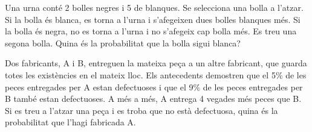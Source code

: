 \begin{probres}
{Una urna cont\'e 2 bolles negres i 5 de blanques. Se selecciona
una bolla a l'atzar. Si la bolla \'es blanca, es torna a l'urna i s'afegeixen
dues bolles blanques m\'es. Si la bolla \'es negra, no es torna a
l'urna i no s'afegeix cap bolla m\'es. Es treu una segona bolla. Quina \'es
la probabilitat que la bolla sigui blanca?}
\end{probres}


\begin{probres}
{Dos fabricants, A i B, entreguen la mateixa pe\c{c}a a un
altre fabricant, que guarda totes les exist\`encies en el mateix lloc. Els
antecedents demostren que el 5\% de les peces entregades per A estan
defectuoses i que el 9\% de les peces entregades per B tamb\'e estan
defectuoses. A m\'es a m\'es, A entrega 4 vegades m\'es peces que B. Si es treu a
l'atzar una pe\c{c}a i es troba que no est\`a defectuosa, quina \'es la
probabilitat que l'hagi fabricada A.}
\end{probres}


